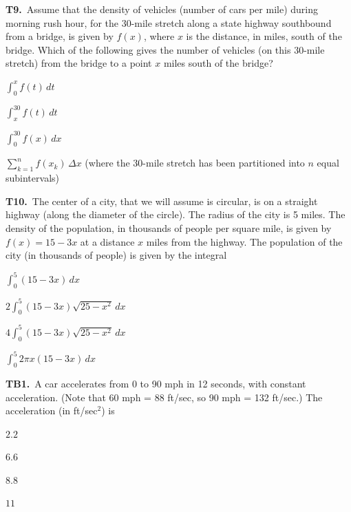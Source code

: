 \documentclass[11pt]{article}
\begin{document}
\bigskip\noindent\textbf{T9.}\ Assume that the density of vehicles (number of cars per mile) during morning rush hour, for the 30-mile stretch along a state highway southbound from a bridge, is given by $f(x)$, where $x$ is the distance, in miles, south of the bridge. Which of the following gives the number of vehicles (on this 30-mile stretch) from the bridge to a point $x$ miles south of the bridge?
\begin{list}{}{\setlength{\leftmargin}{3em}\setlength{\labelwidth}{2.5em}\setlength{\itemsep}{0pt}\setlength{\topsep}{2pt}}
\item[(A)] $\displaystyle\int_0^x f(t)\,dt$
\item[(B)] $\displaystyle\int_x^{30} f(t)\,dt$
\item[(C)] $\displaystyle\int_0^{30} f(x)\,dx$
\item[(D)] $\displaystyle\sum_{k=1}^n f(x_k)\,\Delta x$ (where the 30-mile stretch has been partitioned into $n$ equal subintervals)
\end{list}

\bigskip\noindent\textbf{T10.}\ The center of a city, that we will assume is circular, is on a straight highway (along the diameter of the circle). The radius of the city is 5 miles. The density of the population, in thousands of people per square mile, is given by $f(x)=15-3x$ at a distance $x$ miles from the highway. The population of the city (in thousands of people) is given by the integral
\begin{list}{}{\setlength{\leftmargin}{3em}\setlength{\labelwidth}{2.5em}\setlength{\itemsep}{0pt}\setlength{\topsep}{2pt}}
\item[(A)] $\displaystyle\int_0^5 (15-3x)\,dx$
\item[(B)] $\displaystyle 2\int_0^5 (15-3x)\sqrt{25-x^2}\,dx$
\item[(C)] $\displaystyle 4\int_0^5 (15-3x)\sqrt{25-x^2}\,dx$
\item[(D)] $\displaystyle\int_0^5 2\pi x(15-3x)\,dx$
\end{list}

\bigskip\noindent\textbf{TB1.}\ A car accelerates from 0 to 90 mph in 12 seconds, with constant acceleration. (Note that 60 mph = 88 ft/sec, so 90 mph = 132 ft/sec.) The acceleration (in ft/sec$^2$) is
\begin{list}{}{\setlength{\leftmargin}{3em}\setlength{\labelwidth}{2.5em}\setlength{\itemsep}{0pt}\setlength{\topsep}{2pt}}
\item[(A)] $2.2$
\item[(B)] $6.6$
\item[(C)] $8.8$
\item[(D)] $11$
\end{list}
\end{document}
